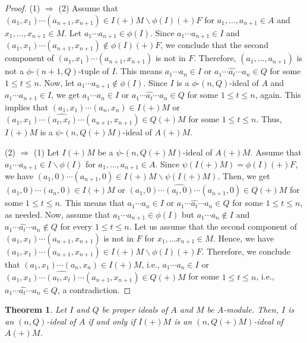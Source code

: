 \documentclass[preprint,review,10pt]{amsart}
\newtheorem{theorem}{Theorem}[section]
\theoremstyle{definition}
\theoremstyle{remark}
\numberwithin{equation}{section}
\begin{document}
 \begin{proof}
 (1) $\Longrightarrow$ (2) Assume that $(a_1, x_1)\cdots (a_{n+1},x_{n+1}) \in  I(+)M  \backslash \phi(I) (+) F$ for $a_1,\ldots, a_{n+1} \in A$ and $x_1,\ldots,x_{n+1} \in M$. Let $a_1 \cdots a_{n+1} \in \phi(I)$. Since $a_1 \cdots a_{n+1} \in I$  and $(a_1, x_1)\cdots (a_{n+1},x_{n+1}) \notin  \phi(I) (+) F$,  we conclude that the second component of $(a_1, x_1)\cdots (a_{n+1},x_{n+1})$ is not in $F$. Therefore, $(a_1,\ldots,a_{n+1})$   is not a $\phi$-$(n+1,Q)$-tuple of $I$. This means $a_1 \cdots  a_n \in I$ or $a_1 \cdots  \widehat{a_t} \cdots a_n \in Q$ for some $1 \leq t \leq n$. Now, let $a_1 \cdots a_{n+1} \notin \phi(I)$. Since $I$ is a $\phi$-$(n,Q)$-ideal of $A$ and $a_1 \cdots a_{n+1} \in I$, we get $a_1 \cdots  a_n \in I$ or $a_1 \cdots  \widehat{a_t} \cdots a_n \in Q$ for some $1 \leq t \leq n$, again. This implies that $(a_1, x_1)\cdots (a_n,x_n) \in  I(+)M $ or $(a_1, x_1)\cdots \widehat{(a_t, x_t)} \cdots (a_{n+1},x_{n+1}) \in  Q(+)M$ for some $1 \leq t \leq n$. Thus, $I(+)M$ is a $\psi$-$(n,Q(+)M)$-ideal of  $A(+)M$.
 
 (2) $\Longrightarrow$ (1) Let  $I(+)M$ be  a $\psi$-$(n,Q(+)M)$-ideal of  $A(+)M$. Assume that $a_1 \cdots a_{n+1} \in I \backslash \phi(I)$ for $a_1, \ldots, a_{n+1} \in A $. Since $\psi(I (+) M)=\phi(I) (+) F$, we have  $(a_1, 0)\cdots (a_{n+1},0) \in  I(+)M  \backslash \psi( I  (+) M)$. Then, we get $(a_1, 0)\cdots (a_n,0) \in  I(+)M $ or $(a_1,0)\cdots \widehat{(a_t, 0)} \cdots (a_{n+1},0) \in  Q(+)M$ for some $1 \leq t \leq n$. This means that $a_1 \cdots  a_n \in I$ or $a_1 \cdots  \widehat{a_t} \cdots a_n \in Q$ for some $1 \leq t \leq n$, as needed. Now, assume that  $a_1 \cdots  a_{n+1} \in \phi(I)$  but $a_1 \cdots  a_n \notin I$ and $a_1 \cdots  \widehat{a_t} \cdots a_n \notin Q$ for every  $1 \leq t \leq n$. Let us assume that the second component of $(a_1, x_1)\cdots (a_{n+1},x_{n+1})$ is not in $F$ for   $x_1,\ldots x_{n+1} \in M$. Hence, we have $(a_1, x_1)\cdots (a_{n+1},x_{n+1}) \in  I(+)M  \backslash \phi(I) (+) F$. Therefore, we conclude that  $(a_1, x_1)\cdots (a_n,x_n) \in  I(+)M $, i.e., $a_1 \cdots  a_n \in I$ or $(a_1, x_1)\cdots \widehat{(a_t, x_t)} \cdots (a_{n+1},x_{n+1}) \in  Q(+)M$ for some $1 \leq t \leq n$, i.e., $a_1 \cdots  \widehat{a_t} \cdots a_n \in Q$, a contradiction.
 \end{proof}
 \begin{theorem}
 Let $I$ and $Q$ be proper  ideals of $A$ and $M$ be  $A$-module. Then,   $I$ is an  $(n,Q)$-ideal of $A$ if and only if $I (+) M$ is an $(n,Q(+)M)$-ideal of $A (+) M$. 
 \end{theorem}
\end{document}
